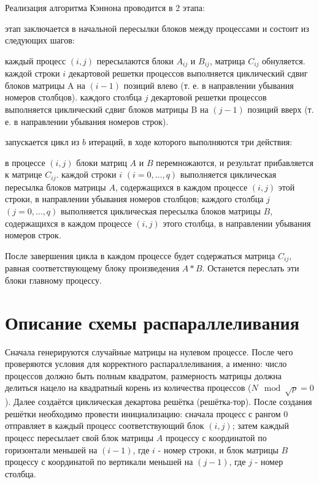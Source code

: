\documentclass[12pt, letterpaper]{article}
\begin{document}
Реализация алгоритма Кэннона проводится в 2 этапа:
\begin{enumerate}
 этап заключается в начальной пересылки блоков между процессами и состоит из следующих шагов:
    \begin{enumerate}
     каждый процесс $(i, j)$ пересылаются блоки $A_{ij}$ и $B_{ij}$, матрица $C_{ij}$ обнуляется.
     каждой строки $i$ декартовой решетки процессов выполняется циклический сдвиг блоков матрицы A на $(i - 1)$ позиций влево (т. е. в направлении убывания номеров столбцов).
     каждого столбца $j$ декартовой решетки процессов выполняется циклический сдвиг блоков матрицы B на $(j - 1)$ позиций вверх (т. е. в направлении убывания номеров строк).
    \end{enumerate}
 запускается цикл из $b$ итераций, в ходе которого выполняются три действия:
    \begin{enumerate}
     в процессе $(i, j)$ блоки матриц $A$ и $B$ перемножаются, и результат прибавляется к
    матрице $C_{ij}$.
     каждой строки $i$ $(i = 0 , …, q)$ выполняется циклическая пересылка блоков матрицы $A$, содержащихся в каждом процессе $(i, j)$ этой строки, в направлении убывания номеров столбцов;
     каждого столбца $j$ $(j = 0 , …, q)$ выполняется циклическая пересылка блоков матрицы $B$, содержащихся в каждом процессе $(i, j)$ этого столбца, в направлении убывания номеров строк.
    \end{enumerate}
После завершения цикла в каждом процессе будет содержаться матрица $C_{ij}$, равная соответствующему блоку произведения $A*B$. Останется переслать эти блоки главному процессу.

\end{enumerate}
\newpage

\section*{Описание схемы распараллеливания}
\par Сначала генерируются случайные матрицы на нулевом процессе. После чего проверяются условия для корректного распараллеливания, а именно: число процессов должно быть полным квадратом, размерность матрицы должна делиться нацело на квадратный корень из количества процессов ($N\mod\sqrt{p}=0$). Далее создаётся циклическая декартова решётка (решётка-тор). После создания решётки необходимо провести инициализацию: сначала процесс с рангом 0 отправляет в каждый процесс соответствующий блок $(i, j)$; затем каждый процесс пересылает свой блок матрицы $A$ процессу с координатой по горизонтали меньшей на $(i - 1)$, где $i$ - номер строки, и блок матрицы $B$ процессу с координатой по вертикали меньшей на $(j - 1)$, где $j$ - номер столбца. 
\end{document}
